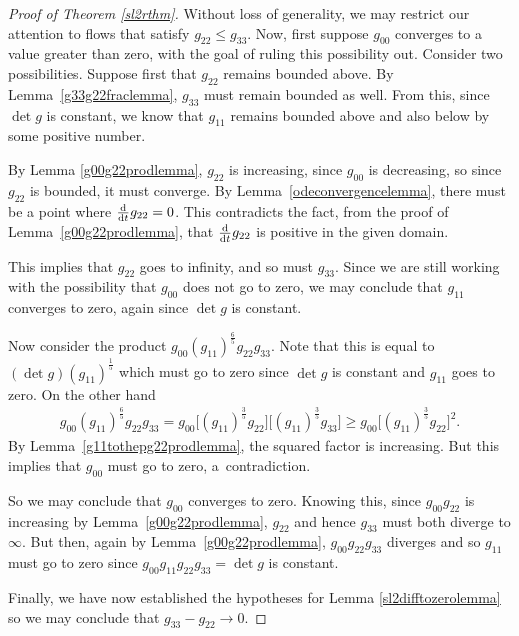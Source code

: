 \documentclass[10pt,a4paper]{amsart}
\numberwithin{equation}{section}
\newcommand{\dtime}{\frac{{\rm d}}{{\rm d} t}} %
\begin{document}
\begin{proof}[Proof of Theorem \ref{sl2rthm}]
Without loss of generality, we may restrict our attention to flows that satisfy $g_{22} \leq g_{33}$. Now, first suppose $g_{00}$ converges to a value greater than zero, with the goal of ruling this possibility out. Consider two possibilities. Suppose first that $g_{22}$ remains bounded above. By Lemma~\ref{g33g22fraclemma}, $g_{33}$ must remain bounded as well. From this, since $\det g$ is constant, we know that $g_{11}$ remains bounded above and also below by some positive number.

By Lemma \ref{g00g22prodlemma}, $g_{22}$ is increasing, since $g_{00}$ is decreasing, so since $g_{22}$ is bounded, it must converge. By Lemma~\ref{odeconvergencelemma}, there must be a point where $\dtime g_{22} = 0$. This contradicts the fact, from the proof of Lemma~\ref{g00g22prodlemma}, that $\dtime g_{22}$ is positive in the given domain.

This implies that $g_{22}$ goes to infinity, and so must $g_{33}$. Since we are still working with the possibility that $g_{00}$ does not go to zero, we may conclude that $g_{11}$ converges to zero, again since $\det g$ is constant.

Now consider the product $g_{00} (g_{11})^{\frac{6}{5}} g_{22} g_{33}$. Note that this is equal to $(\det g)(g_{11})^{\frac{1}{5}}$ which must go to zero since $\det g$ is constant and $g_{11}$ goes to zero. On the other hand
\begin{gather*}
g_{00} (g_{11})^{\frac{6}{5}} g_{22} g_{33} = g_{00} \big[(g_{11})^{\frac{3}{5}}g_{22}\big] \big[(g_{11})^{\frac{3}{5}}g_{33}\big] \geq g_{00} \big[(g_{11})^{\frac{3}{5}}g_{22}\big]^2.
\end{gather*}
By Lemma~\ref{g11tothepg22prodlemma}, the squared factor is increasing. But this implies that $g_{00}$ must go to zero, a~contradiction.

So we may conclude that $g_{00}$ converges to zero. Knowing this, since $g_{00} g_{22}$ is increasing by Lemma~\ref{g00g22prodlemma}, $g_{22}$ and hence $g_{33}$ must both diverge to $\infty$. But then, again by Lemma~\ref{g00g22prodlemma}, $g_{00} g_{22} g_{33}$ diverges and so $g_{11}$ must go to zero since $g_{00} g_{11} g_{22} g_{33} = \det g$ is constant.

Finally, we have now established the hypotheses for Lemma \ref{sl2difftozerolemma} so we may conclude that $g_{33} - g_{22} \rightarrow 0$.
\end{proof}
\end{document}
